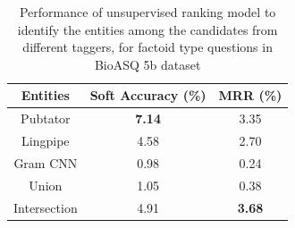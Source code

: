 \begin{table}[t!]
    \centering
    \begin{tabular}{ccc} \hline
    Entities & Soft Accuracy (\%) & MRR (\%) \\ \hline
    Pubtator & \textbf{7.14} & 3.35 \\
    Lingpipe & 4.58 & 2.70 \\
    Gram CNN & 0.98 & 0.24 \\
    Union    & 1.05 & 0.38 \\
    Intersection & 4.91 & \textbf{3.68} \\ \hline
    \end{tabular}
    \caption{Performance of unsupervised ranking model to identify the entities among the candidates from different taggers, for factoid type questions in BioASQ 5b dataset}
    \label{tab:my_label}
\end{table}

